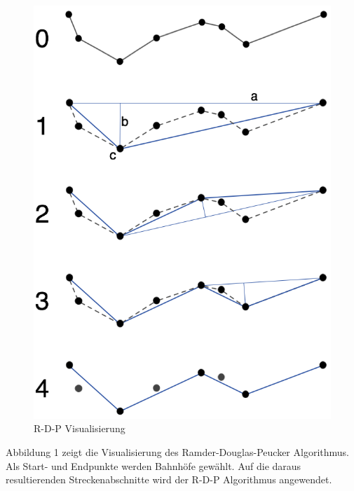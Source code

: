 \documentclass[twoside]{scrartcl}
\begin{document}
\begin{figure}
  \begin{center}
    \includegraphics[scale=0.20]{rdp.png}
  \end{center}
  \caption{R-D-P Visualisierung}
\end{figure}

Abbildung 1 zeigt die Visualisierung des Ramder-Douglas-Peucker
Algorithmus.\\
Als Start- und Endpunkte werden Bahnhöfe gewählt. Auf die daraus
resultierenden Streckenabschnitte wird der R-D-P Algorithmus
angewendet.
\end{document}
